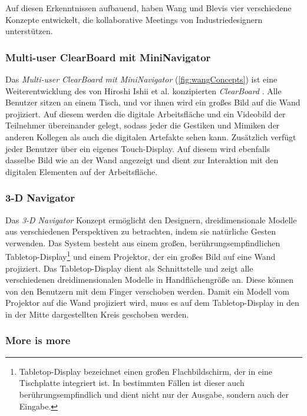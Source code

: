 Auf diesen Erkenntnissen aufbauend, haben Wang und Blevis \citep{Wang:2004p110} vier verschiedene Konzepte entwickelt, die kollaborative Meetings von Industriedesignern unterstützen. 

\subsubsection{Multi-user ClearBoard mit MiniNavigator} 

Das \emph{Multi-user ClearBoard mit MiniNavigator} (\autoref{fig:wangConcepts}) ist eine Weiterentwicklung des von Hiroshi Ishii et al. konzipierten \emph{ClearBoard} \citep{Ishii:1994p243}. Alle Benutzer sitzen an einem Tisch, und vor ihnen wird ein großes Bild auf die Wand projiziert. Auf diesem werden die digitale Arbeitsfläche und ein Videobild der Teilnehmer übereinander gelegt, sodass jeder die Gestiken und Mimiken der anderen Kollegen als auch die digitalen Artefakte sehen kann. Zusätzlich verfügt jeder Benutzer über ein eigenes Touch-Display. Auf diesem wird ebenfalls dasselbe Bild wie an der Wand angezeigt und dient zur Interaktion mit den digitalen Elementen auf der Arbeitsfläche.

\subsubsection{3-D Navigator} 

Das \emph{3-D Navigator} Konzept ermöglicht den Designern, dreidimensionale Modelle aus verschiedenen Perspektiven zu betrachten, indem sie natürliche Gesten verwenden. Das System besteht aus einem großen, berührungsempfindlichen Tabletop-Display\footnote{\label{fn:tableTop}Tabletop-Display bezeichnet einen großen Flachbildschirm, der in eine Tischplatte integriert ist. In bestimmten Fällen ist dieser auch berührungsempfindlich und dient nicht nur der Ausgabe, sondern auch der Eingabe.} und einem Projektor, der ein großes Bild auf eine Wand projiziert. Das Tabletop-Display dient als Schnittstelle und zeigt alle verschiedenen dreidimensionalen Modelle in Handflächengröße an. Diese können von den Benutzern mit dem Finger verschoben werden. Damit ein Modell vom Projektor auf die Wand projiziert wird, muss es auf dem Tabletop-Display in den in der Mitte dargestellten Kreis geschoben werden. 

\subsubsection{More is more} 


